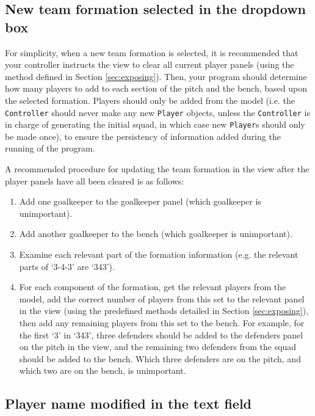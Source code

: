 \documentclass[11pt]{article}
\begin{document}
\subsection{New team formation selected in the dropdown box}

For simplicity, when a new team formation is selected, it is recommended that your controller instructs the view to clear all current player panels (using the method defined in Section \ref{sec:exposing}). Then, your program should determine how many players to add to each section of the pitch and the bench, based upon the selected formation. Players should only be added from the model (i.e. the \texttt{Controller} should never make any new \texttt{Player} objects, unless the \texttt{Controller} is in charge of generating the initial squad, in which case new \texttt{Player}s should only be made once), to ensure the persistency of information added during the running of the program.

A recommended procedure for updating the team formation in the view after the player panels have all been cleared is as follows:

\begin{enumerate}

	\item Add one goalkeeper to the goalkeeper panel (which goalkeeper is unimportant).
	
	\item Add another goalkeeper to the bench (which goalkeeper is unimportant).
	
	\item Examine each relevant part of the formation information (e.g. the relevant parts of `3-4-3' are `343').
	
	\item For each component of the formation, get the relevant players from the model, add the correct number of players from this set to the relevant panel in the view (using the predefined methods detailed in Section \ref{sec:exposing}), then add any remaining players from this set to the bench. For example, for the first `3' in `343', three defenders should be added to the defenders panel on the pitch in the view, and the remaining two defenders from the squad should be added to the bench. Which three defenders are on the pitch, and which two are on the bench, is unimportant.

\end{enumerate}

\subsection{Player name modified in the text field}
\label{sec:namemod}
\end{document}
